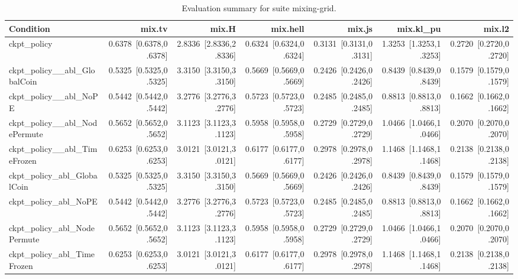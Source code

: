 \begin{table}[t]
\centering
\caption{Evaluation summary for suite mixing-grid.}
\label{tab:eval_mixing-grid}
\begin{tabular}{lrrrrrr}
\toprule
Condition & mix.tv & mix.H & mix.hell & mix.js & mix.kl\_pu & mix.l2 \\
\midrule
ckpt\_policy & 0.6378~[0.6378,0.6378] & 2.8336~[2.8336,2.8336] & 0.6324~[0.6324,0.6324] & 0.3131~[0.3131,0.3131] & 1.3253~[1.3253,1.3253] & 0.2720~[0.2720,0.2720] \\
ckpt\_policy\_\_abl\_GlobalCoin & 0.5325~[0.5325,0.5325] & 3.3150~[3.3150,3.3150] & 0.5669~[0.5669,0.5669] & 0.2426~[0.2426,0.2426] & 0.8439~[0.8439,0.8439] & 0.1579~[0.1579,0.1579] \\
ckpt\_policy\_\_abl\_NoPE & 0.5442~[0.5442,0.5442] & 3.2776~[3.2776,3.2776] & 0.5723~[0.5723,0.5723] & 0.2485~[0.2485,0.2485] & 0.8813~[0.8813,0.8813] & 0.1662~[0.1662,0.1662] \\
ckpt\_policy\_\_abl\_NodePermute & 0.5652~[0.5652,0.5652] & 3.1123~[3.1123,3.1123] & 0.5958~[0.5958,0.5958] & 0.2729~[0.2729,0.2729] & 1.0466~[1.0466,1.0466] & 0.2070~[0.2070,0.2070] \\
ckpt\_policy\_\_abl\_TimeFrozen & 0.6253~[0.6253,0.6253] & 3.0121~[3.0121,3.0121] & 0.6177~[0.6177,0.6177] & 0.2978~[0.2978,0.2978] & 1.1468~[1.1468,1.1468] & 0.2138~[0.2138,0.2138] \\
ckpt\_policy\_abl\_GlobalCoin & 0.5325~[0.5325,0.5325] & 3.3150~[3.3150,3.3150] & 0.5669~[0.5669,0.5669] & 0.2426~[0.2426,0.2426] & 0.8439~[0.8439,0.8439] & 0.1579~[0.1579,0.1579] \\
ckpt\_policy\_abl\_NoPE & 0.5442~[0.5442,0.5442] & 3.2776~[3.2776,3.2776] & 0.5723~[0.5723,0.5723] & 0.2485~[0.2485,0.2485] & 0.8813~[0.8813,0.8813] & 0.1662~[0.1662,0.1662] \\
ckpt\_policy\_abl\_NodePermute & 0.5652~[0.5652,0.5652] & 3.1123~[3.1123,3.1123] & 0.5958~[0.5958,0.5958] & 0.2729~[0.2729,0.2729] & 1.0466~[1.0466,1.0466] & 0.2070~[0.2070,0.2070] \\
ckpt\_policy\_abl\_TimeFrozen & 0.6253~[0.6253,0.6253] & 3.0121~[3.0121,3.0121] & 0.6177~[0.6177,0.6177] & 0.2978~[0.2978,0.2978] & 1.1468~[1.1468,1.1468] & 0.2138~[0.2138,0.2138] \\
\bottomrule
\end{tabular}
\end{table}
